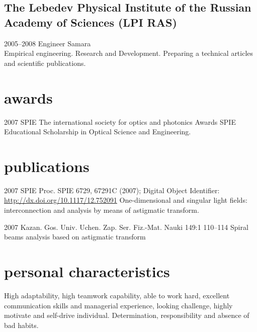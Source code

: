 \documentclass[nocolors]{friggeri-cv-a4}
\begin{document}
\subsection{The Lebedev Physical Institute of the Russian Academy of Sciences (LPI RAS)}
\begin{entrylist}
\entry
{2005--2008}
{Engineer}
{Samara}
{\emph{} \\
  Empirical engineering.
  Research and Development.
  Preparing a technical articles and scientific publications.
}

\end{entrylist}


\section{awards}
\begin{entrylist}
\entry
{2007}
{SPIE}
{The international society for optics and photonics}
{Awards SPIE Educational Scholarship in Optical Science and Engineering.}
\end{entrylist}


\section{publications}
\begin{entrylist}
\entry
{2007}
{SPIE}
{Proc. SPIE 6729, 67291C (2007); Digital Object Identifier:
\href{http://dx.doi.org/10.1117/12.752091}{http://dx.doi.org/10.1117/12.752091}}
{One-dimensional and singular light fields: interconnection and analysis by means of astigmatic transform.}
\end{entrylist}

\begin{entrylist}
\entry
{2007}
{Kazan. Gos. Univ. Uchen. Zap.}
{Ser. Fiz.-Mat. Nauki 149:1 110–114}
{Spiral beams analysis based on astigmatic transform}
\end{entrylist}

\section{personal characteristics}
\textbf{}{High adaptability, high teamwork capability, able to work hard, excellent communication skills and managerial experience, looking challenge, highly motivate and self-drive individual.}
\textbf{}{Determination, responsibility and absence of bad habits.}
\end{document}
